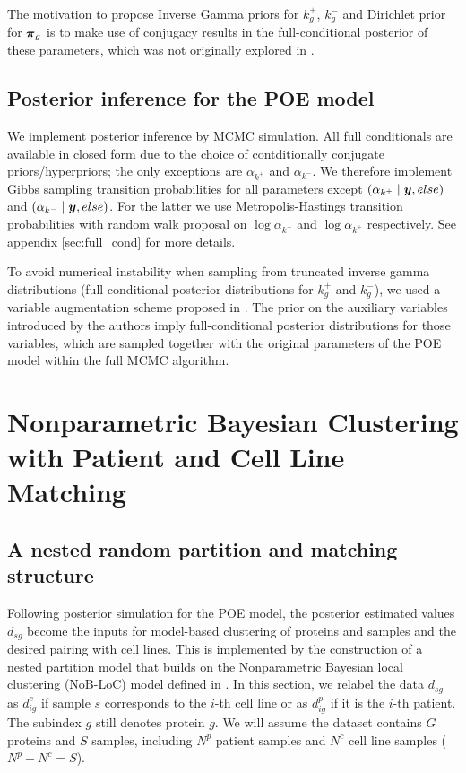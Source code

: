  The motivation to propose Inverse Gamma priors for $k^+_g$, $k^-_g$ and Dirichlet prior for $\mbox{\boldmath $\pi$}_g$ is to make use of conjugacy results in the full-conditional posterior of these parameters, which was not originally explored in \cite{poe_2002}. 

\subsection{Posterior inference for the POE model}

We implement posterior inference by MCMC simulation. All full conditionals are available in closed form due to the choice of contditionally conjugate priors/hyperpriors; the only exceptions are $\alpha_{k^+}$ and $\alpha_{k^-}$. We therefore implement Gibbs sampling transition probabilities for all parameters except $(\alpha_{k^+} \mid \mbox{\boldmath $y$}, else)$ and $(\alpha_{k^-} \mid \mbox{\boldmath $y$}, else)$. For the latter we use Metropolis-Hastings transition probabilities with random walk proposal on $\log \alpha_{k^+}$ and $\log \alpha_{k^+}$ respectively. See appendix \ref{sec:full_cond} for more details.

To avoid numerical instability when sampling from truncated inverse gamma distributions (full conditional posterior distributions for $k^+_g$ and $k^-_g$), we used a variable augmentation scheme proposed in \cite{damien2001}. The prior on the auxiliary variables introduced by the authors imply full-conditional posterior distributions for those variables, which are sampled together with the original parameters of the POE model within the full MCMC algorithm.

\section{Nonparametric Bayesian Clustering with Patient and Cell Line Matching}
\label{sec:nobloc2}

\subsection{ A nested random partition and matching structure}
\label{sec:nobloc_matching}

Following posterior simulation for the POE model, the posterior estimated values $d_{sg}$ become the inputs for model-based clustering of proteins and samples and the desired pairing with cell lines. This is implemented by the construction of a nested partition model that builds on the Nonparametric Bayesian local clustering (NoB-LoC) model defined in \cite{lee2013}. In this section, we relabel the data $d_{sg}$ as $d^c_{ig}$ if sample $s$ corresponds to the $i$-th cell line or as $d^p_{ig}$ if it is the $i$-th patient. The subindex $g$ still denotes protein $g$. We will assume the dataset contains $G$ proteins and $S$ samples, including $N^p$ patient samples and $N^c$ cell line samples ($N^p + N^c = S$).


